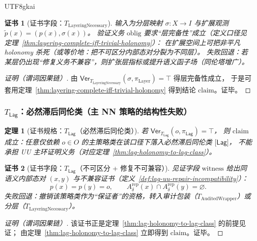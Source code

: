 \documentclass[12pt]{article}
\newtheorem{theorem}{定理}[section]
\newtheorem{Certificate}{证书}[section]
\begin{document}
\begin{CJK*}{UTF8}{gkai}
\begin{Certificate}[证书字段：$T_{\mathrm{LayeringNecessary}}$]
\label{cert:certspec-t-layering}
输入为分层映射 $\sigma:X\to I$ 与扩展观测 $\tilde p(x)=(p(x),\sigma(x))$。
验证义务 $\mathrm{oblig}$ 要求“层完备性”成立（定义口径见定理~\ref{thm:layering-complete-iff-trivial-holonomy}）：
在扩展空间上可把非平凡 holonomy 杀死（或等价地：把不可区分内部态对分裂为不同层）。
失败回退：若某层仍出现“修复义务不兼容”，则扩张层指标或提升语义函子场（同伦塔增广）。
\end{Certificate}

\begin{proof}[证明（谓词因果链）]
由 $\mathsf{Ver}_{T_{\mathrm{LayeringNecessary}}}(\sigma,\pi_{\mathrm{Layer}})=\top$ 得层完备性成立，
于是可套用定理~\ref{thm:layering-complete-iff-trivial-holonomy} 得到结论 $\mathrm{claim}$。证毕。
\end{proof}

\subsubsection{$T_{\mathsf{Lag}}$：必然滞后同伦类（主 NN 策略的结构性失败）}
\label{sec:certschema-t-lag}

\begin{theorem}[证书规格：$T_{\mathsf{Lag}}$（必然滞后同伦类）]
\label{thm:certspec-t-lag}
若 $\mathsf{Ver}_{T_{\mathsf{Lag}}}(o,\pi_{\mathsf{Lag}})=\top$，
则 $\mathrm{claim}$ 成立：任意仅依赖 $o\in O$ 的主策略类在该口径下落入必然滞后同伦类 $\lbrack\mathsf{Lag}\rbrack$，
不能承担 UU 主环证明义务（对应定理~\ref{thm:lag-holonomy-to-lag-class}）。
\end{theorem}

\begin{Certificate}[证书字段：$T_{\mathsf{Lag}}$（不可区分 + 修复不可兼容）]
\label{cert:certspec-t-lag}
见证字段 $\mathrm{witness}$ 给出同语义内部态对 $(x,y)$ 与不兼容证书（定义~\ref{def:lag-uu-repair-incompatibility}）：
\[
  p(x)=p(y)=o,\qquad A^{\mathrm{rep}}_{\delta}(x)\cap A^{\mathrm{rep}}_{\delta}(y)=\varnothing.
\]
失败回退：撤销该策略类作为“保证者”的资格，转入审计包装（$T_{\mathrm{AuditedWrapper}}$）或分层（$T_{\mathrm{LayeringNecessary}}$）。
\end{Certificate}

\begin{proof}[证明（谓词因果链）]
该证书正是定理~\ref{thm:lag-holonomy-to-lag-class} 的前提见证；
由定理~\ref{thm:lag-holonomy-to-lag-class} 立即得到 $\mathrm{claim}$。证毕。
\end{proof}


\end{CJK*}
\end{document}
